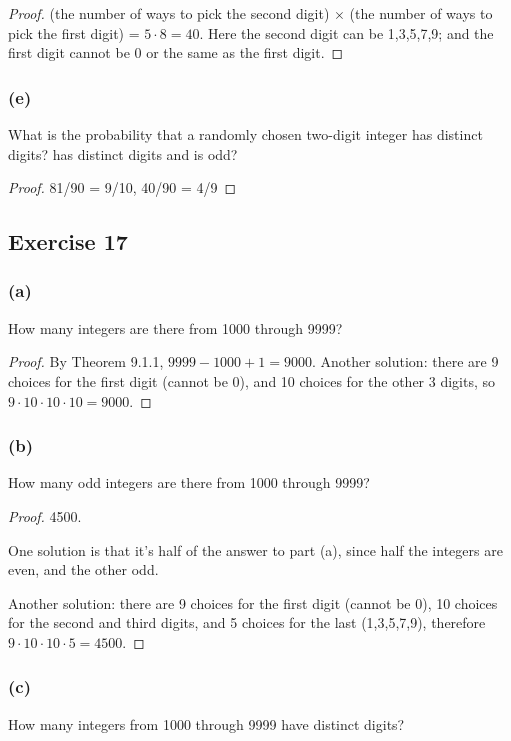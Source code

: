 \documentclass[14pt]{extarticle}
\begin{document}
\begin{proof}
(the number of ways to pick the second digit) \(\times\) (the number of ways to pick the first digit) = \(5 \cdot 8 
= 40\). Here the second digit can be 1,3,5,7,9; and the first digit cannot be 0 or the same as the first digit.
\end{proof}

\subsubsection{(e)}
What is the probability that a randomly chosen two-digit integer has distinct digits? has distinct digits and is odd?

\begin{proof}
81/90 = 9/10, 40/90 = 4/9
\end{proof}

\subsection{Exercise 17}
\subsubsection{(a)}
How many integers are there from 1000 through 9999?

\begin{proof}
By Theorem 9.1.1, \(9999-1000+1 = 9000\). Another solution: there are 9 choices for the first digit (cannot be 0), and
10 choices for the other 3 digits, so \(9 \cdot 10 \cdot 10 \cdot 10 = 9000\).
\end{proof}

\subsubsection{(b)}
How many odd integers are there from 1000 through 9999?

\begin{proof}
4500.

One solution is that it's half of the answer to part (a), since half the integers are even, and the other odd. 

Another solution: there are 9 choices for the first digit (cannot be 0), 10 choices for the second and third digits,
and 5 choices for the last (1,3,5,7,9), therefore \(9 \cdot 10 \cdot 10 \cdot 5 = 4500\).
\end{proof}

\subsubsection{(c)}
How many integers from 1000 through 9999 have distinct digits?
\end{document}
